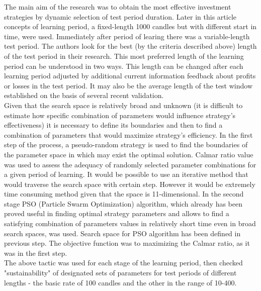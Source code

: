 \documentclass{tewiart}
\begin{document}
The main aim of the research was to obtain the most effective investment strategies by dynamic selection of test period duration. Later in this article concepts of learning period, a fixed-length 1000 candles but with different start in
time, were used.  Immediately after period of learing there was a variable-length test period. The authors look for the best (by the criteria described above) length of the test period in their research. This most preferred length of the learning period can be understood in two ways. This length can be changed after each learning period adjusted by additional current information feedback about profits or losses in the test period. It may also be the average length of the test window established on the basis of several recent validation.\\

Given that the search space is relatively broad and unknown (it is difficult to estimate how specific combination of parameters would influence strategy's effectiveness) it is necessary to define its boundaries and then to find a combination of parameters that would maximize strategy's efficiency.  
In the first step of the process, a pseudo-random strategy is used to find the boundaries of the parameter space in which may exist the optimal solution. Calmar ratio value was used to assess the adequacy of randomly selected parameter combinations for a given period of learning. It would be possible to use an iterative method that would traverse the search space with certain step. However it would be extremely time consuming method given that the space is 11-dimensional. 
In the second stage PSO (Particle Swarm Optimization) \cite{Kennedy}  algorithm, which already has been proved useful in finding optimal strategy parameters \cite{PSOtrading} and allows to find a satisfying combination of parameters values in relatively short time even in broad search spaces, was used. Search space for PSO algorithm has been defined in previous step. The objective function was to maximizing the Calmar ratio, as it was in the first step. \\
The above tactic was used for each stage of the learning period, then checked "sustainability" of designated sets of parameters for test periods of different lengths - the basic rate of 100 candles and the other in the range of 10-400.
\end{document}
